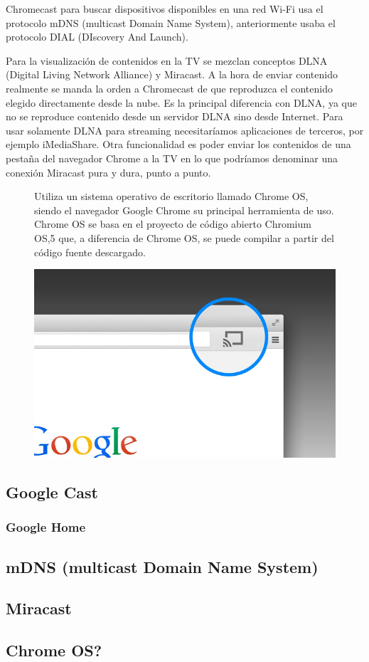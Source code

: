Chromecast para buscar dispositivos disponibles en una red Wi-Fi usa el protocolo mDNS (multicast Domain Name System), anteriormente usaba el protocolo DIAL (DIscovery And Launch).

Para la visualización de contenidos en la TV se mezclan conceptos DLNA (Digital Living Network Alliance) y Miracast\cite{DLNA-Miracast}.
A la hora de enviar contenido realmente se manda la orden a Chromecast de que reproduzca el contenido elegido directamente desde la nube.
Es la principal diferencia con DLNA, ya que no se reproduce contenido desde un servidor DLNA sino desde Internet.
Para usar solamente DLNA para streaming necesitaríamos aplicaciones de terceros, por ejemplo iMediaShare.
Otra funcionalidad es poder enviar los contenidos de una pestaña del navegador Chrome a la TV en lo que podríamos denominar una conexión Miracast pura y dura, punto a punto.




\begin{figure}[ht]
	\begin{minipage}[b]{0.55\linewidth}
	Utiliza un sistema operativo de escritorio llamado Chrome OS, siendo el navegador Google Chrome su principal herramienta de uso.
	Chrome OS se basa en el proyecto de código abierto Chromium OS,5 que, a diferencia de Chrome OS, se puede compilar a partir del código fuente descargado.
	\end{minipage}%
	\begin{minipage}[b]{0.45\linewidth}
		\centering
		\includegraphics[width=.65\linewidth]{./Imagenes/googlecastbrowser.jpg}
	\end{minipage}
\end{figure}







\subsection{Google Cast}
\subsubsection{Google Home}

\subsection{mDNS (multicast Domain Name System)}


\subsection{Miracast}



\subsection{Chrome OS?}
